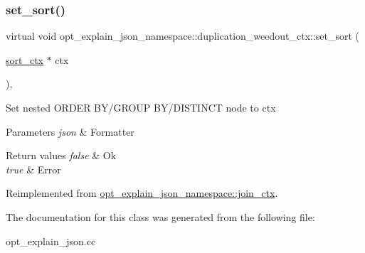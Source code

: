 \subsubsection{\texorpdfstring{set\+\_\+sort()}{set\_sort()}}
{\footnotesize\ttfamily virtual void opt\+\_\+explain\+\_\+json\+\_\+namespace\+::duplication\+\_\+weedout\+\_\+ctx\+::set\+\_\+sort (\begin{DoxyParamCaption}\item[{\mbox{\hyperlink{classopt__explain__json__namespace_1_1sort__ctx}{sort\+\_\+ctx}} $\ast$}]{ctx }\end{DoxyParamCaption})\hspace{0.3cm}{\ttfamily [inline]}, {\ttfamily [virtual]}}

Set nested O\+R\+D\+ER B\+Y/\+G\+R\+O\+UP B\+Y/\+D\+I\+S\+T\+I\+N\+CT node to {\ttfamily ctx} 


\begin{DoxyParams}{Parameters}
{\em json} & Formatter\\
\hline
\end{DoxyParams}

\begin{DoxyRetVals}{Return values}
{\em false} & Ok \\
\hline
{\em true} & Error \\
\hline
\end{DoxyRetVals}


Reimplemented from \mbox{\hyperlink{classopt__explain__json__namespace_1_1join__ctx_a4da472e6a104b4e13dbc0a39450b4a95}{opt\+\_\+explain\+\_\+json\+\_\+namespace\+::join\+\_\+ctx}}.



The documentation for this class was generated from the following file\+:\begin{DoxyCompactItemize}
\item 
opt\+\_\+explain\+\_\+json.\+cc\end{DoxyCompactItemize}
